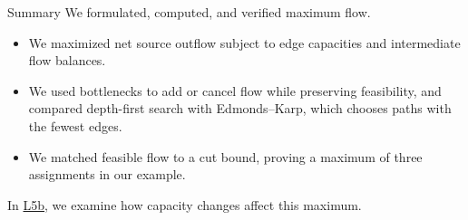 \documentclass[aspectratio=169,11pt]{beamer}
\newcommand{\lablink}{https://github.com/varnerlab/CHEME-5800-CourseRepository-Fall-2026/blob/main/weeks/week-05/L5b/CHEME-5800-L5b-Lab-MaximumFlowSensitivity-Fall-2026.ipynb}
\begin{document}
\begin{frame}{Summary}
  We formulated, computed, and verified maximum flow.

  \vspace{0.6em}
  {\large\textbf{}}
  \vspace{0.3em}
  \begin{itemize}\setlength{\itemsep}{0.6em}
    \item \textbf{} We maximized net source
      outflow subject to edge capacities and intermediate flow balances.
    \item \textbf{} We used bottlenecks to add
      or cancel flow while preserving feasibility, and compared depth-first
      search with Edmonds–Karp, which chooses paths with the fewest edges.
    \item \textbf{} We matched feasible flow
      to a cut bound, proving a maximum of three assignments in our example.
  \end{itemize}

  \vspace{0.5em}
  In \href{\lablink}{L5b}, we examine how capacity changes affect this maximum.
\end{frame}
\end{document}
